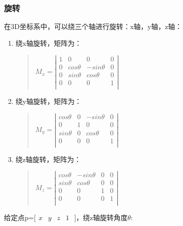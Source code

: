 \documentclass[a4paper,10pt]{article}
\begin{document}
\begin{CJK}{UTF8}{song}
\subsubsection{旋转}
在3D坐标系中，可以绕三个轴进行旋转：x轴，y轴，z轴：
\begin{enumerate}
\item 绕x轴旋转，矩阵为：
\begin{quote}
\begin{math}
M_{x}=\left|
\begin{array}{cccc}
1 & 0 & 0 & 0 \\
0 & cos\theta & -sin\theta & 0 \\
0 & sin\theta & cos\theta & 0 \\
0 & 0 & 0 & 1 \\
\end{array}
\right|
\end{math}
\end{quote}
\item 绕y轴旋转，矩阵为：
\begin{quote}
\begin{math}
M_{y}=\left|
\begin{array}{cccc}
cos\theta & 0 & -sin\theta & 0  \\
0 & 1 & 0 & 0 \\
sin\theta & 0 & cos\theta & 0 \\
0 & 0 & 0 & 1 \\
\end{array}
\right| 
\end{math}
\end{quote}
\item 绕z轴旋转，矩阵为：
\begin{quote}
\begin{math}
M_{z}=\left|
\begin{array}{cccc}
cos\theta & -sin\theta & 0 & 0 \\
sin\theta & cos\theta & 0 & 0 \\
0  & 0 & 1 & 0 \\
0 & 0 & 0 & 1 \\
\end{array}
\right|
\end{math}
\end{quote}
\end{enumerate}
给定点p=[$\begin{array}{cccc} x & y & z & 1 \end{array} $ ]，绕z轴旋转角度$\theta$:
\begin{quote}
\begin{math}

\end{math}
\end{quote}
\end{CJK}
\end{document}
